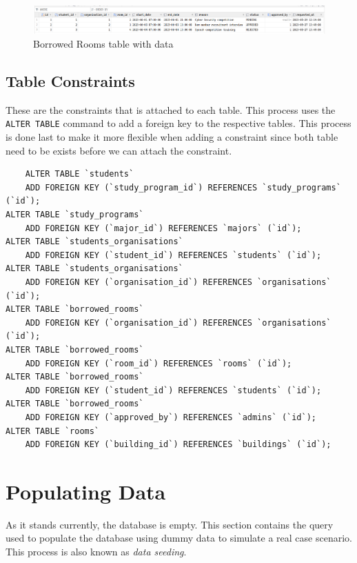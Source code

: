 \documentclass[12pt,titlepage]{article}
\begin{document}
            \pagebreak
            
            \begin{figure}[h]
    \centering
    \includegraphics[width=\textwidth]{./images/borrowed-rooms-table.png}
    \caption{Borrowed Rooms table with data}
\end{figure}

\subsection{Table Constraints}
These are the constraints that is attached to each table. This process uses the \texttt{ALTER TABLE} command
to add a foreign key to the respective tables. This process is done last to make it more flexible when adding a constraint
since both table need to be exists before we can attach the constraint.

\begin{verbatim}
    ALTER TABLE `students`
    ADD FOREIGN KEY (`study_program_id`) REFERENCES `study_programs` (`id`);
ALTER TABLE `study_programs`
    ADD FOREIGN KEY (`major_id`) REFERENCES `majors` (`id`);
ALTER TABLE `students_organisations`
    ADD FOREIGN KEY (`student_id`) REFERENCES `students` (`id`);
ALTER TABLE `students_organisations`
    ADD FOREIGN KEY (`organisation_id`) REFERENCES `organisations` (`id`);
ALTER TABLE `borrowed_rooms`
    ADD FOREIGN KEY (`organisation_id`) REFERENCES `organisations` (`id`);
ALTER TABLE `borrowed_rooms`
    ADD FOREIGN KEY (`room_id`) REFERENCES `rooms` (`id`);
ALTER TABLE `borrowed_rooms`
    ADD FOREIGN KEY (`student_id`) REFERENCES `students` (`id`);
ALTER TABLE `borrowed_rooms`
    ADD FOREIGN KEY (`approved_by`) REFERENCES `admins` (`id`);
ALTER TABLE `rooms`
    ADD FOREIGN KEY (`building_id`) REFERENCES `buildings` (`id`);
\end{verbatim}

\pagebreak

\section{Populating Data}
As it stands currently, the database is empty. This section contains the query used to populate the database
using dummy data to simulate a real case scenario. This process is also known as \textit{data seeding}.
\end{document}
